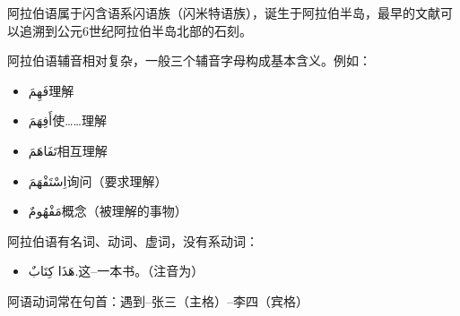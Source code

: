 阿拉伯语属于闪含语系闪语族（闪米特语族），诞生于阿拉伯半岛，最早的文献可以追溯到公元6世纪阿拉伯半岛北部的石刻。

阿拉伯语辅音相对复杂，一般三个辅音字母构成基本含义。例如：

\begin{itemize}
    \item \ac{فَهِمَ}{理解}
    \item \ac{أَفِهَمَ}{使……理解}
    \item \ac{تَفَاهَمَ}{相互理解}
    \item \ac{اِسْتَفْهَمَ}{询问（要求理解）}
    \item \ac{مَفْهُومٌ}{概念（被理解的事物）}
\end{itemize}

阿拉伯语有名词、动词、虚词，没有系动词：

\begin{itemize}
    \item \ac{هَذَا كِتَابٌ.}{这--一本书。（注音为）}
\end{itemize}

阿语动词常在句首：遇到--张三（主格）--李四（宾格）
